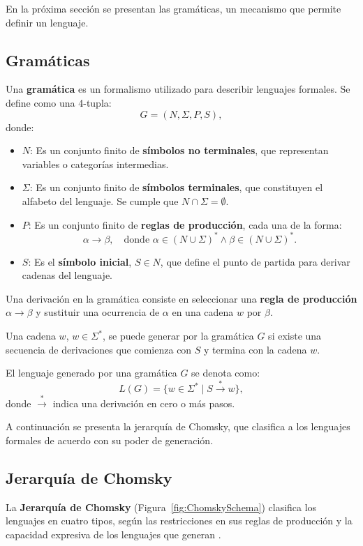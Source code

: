 \documentclass[12pt]{article}
\begin{document}
En la próxima sección se presentan las gramáticas, un mecanismo que permite definir un lenguaje.

\subsection{Gramáticas}

Una \textbf{gramática} es un formalismo utilizado para describir lenguajes formales. Se define como una 4-tupla:
\[
      G = (N, \Sigma, P, S),
\]
donde:
\begin{itemize}
      \item \(N\): Es un conjunto finito de \textbf{símbolos no terminales}, que representan variables o categorías intermedias.
      \item \(\Sigma\): Es un conjunto finito de \textbf{símbolos terminales}, que constituyen el alfabeto del lenguaje. Se cumple que \(N \cap \Sigma = \emptyset\).
      \item \(P\): Es un conjunto finito de \textbf{reglas de producción}, cada una de la forma:
            \[
                  \alpha \to \beta, \quad \text{donde } \alpha \in (N \cup \Sigma)^* \wedge \beta \in (N \cup \Sigma)^*.
            \]
      \item \(S\): Es el \textbf{símbolo inicial}, \(S \in N\), que define el punto de partida para derivar cadenas del lenguaje.
\end{itemize}

Una derivación en la gramática consiste en seleccionar una \textbf{regla de producción} $\alpha \to \beta$ y sustituir una ocurrencia de 
$\alpha$ en una cadena $w$ por $\beta$.

Una cadena $w$, $w\in\Sigma^*$,  se puede generar por la gramática $G$ si existe una secuencia de derivaciones que comienza con $S$
y termina con la cadena $w$.

El lenguaje generado por una gramática \(G\) se denota como:
\[
      L(G) = \{ w \in \Sigma^* \mid S \overset{*}{\to} w \},
\]
donde \(\overset{*}{\to}\) indica una derivación en cero o más pasos.

A continuación se presenta la jerarquía de Chomsky, que clasifica a los lenguajes formales de acuerdo con su poder de generación.

\subsection{Jerarquía de Chomsky}

La \textbf{Jerarquía de Chomsky} (Figura~\ref{fig:ChomskySchema}) clasifica los lenguajes en cuatro tipos, según las restricciones en sus reglas de producción y la capacidad expresiva de los lenguajes que generan \cite{geeksforgeeks_chomsky_hierarchy}.
\end{document}
